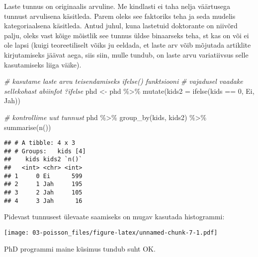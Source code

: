 \documentclass[
]{book}
\newenvironment{Shaded}{\begin{snugshade}}{\end{snugshade}}
\newcommand{\AttributeTok}[1]{\textcolor[rgb]{0.77,0.63,0.00}{#1}}
\newcommand{\CommentTok}[1]{\textcolor[rgb]{0.56,0.35,0.01}{\textit{#1}}}
\newcommand{\DecValTok}[1]{\textcolor[rgb]{0.00,0.00,0.81}{#1}}
\newcommand{\FunctionTok}[1]{\textcolor[rgb]{0.00,0.00,0.00}{#1}}
\newcommand{\NormalTok}[1]{#1}
\newcommand{\OtherTok}[1]{\textcolor[rgb]{0.56,0.35,0.01}{#1}}
\newcommand{\SpecialCharTok}[1]{\textcolor[rgb]{0.00,0.00,0.00}{#1}}
\newcommand{\StringTok}[1]{\textcolor[rgb]{0.31,0.60,0.02}{#1}}
\begin{document}
Laste tunnus on originaalis arvuline. Me kindlasti ei taha nelja väärtusega tunnust arvulisena käsitleda. Parem oleks see faktoriks teha ja seda mudelis kategoriaalsena käsitleda. Antud juhul, kuna lastetuid doktorante on niivõrd palju, oleks vast kõige mõistlik see tunnus üldse binaarseks teha, st kas on või ei ole lapsi (kuigi teoreetiliselt võiks ju eeldada, et laste arv võib mõjutada artiklite kirjutamiseks jäävat aega, siis siin, mulle tundub, on laste arvu variatiivsus selle kasutamiseks liiga väike).

\begin{Shaded}
\begin{Highlighting}[]
\CommentTok{\# kasutame laste arvu teisendamiseks ifelse() funktsiooni}
\CommentTok{\# vajadusel vaadake sellekohast abiinfot ?ifelse}
\NormalTok{phd }\OtherTok{\textless{}{-}}\NormalTok{ phd }\SpecialCharTok{\%\textgreater{}\%} 
  \FunctionTok{mutate}\NormalTok{(}\AttributeTok{kids2 =} \FunctionTok{ifelse}\NormalTok{(kids }\SpecialCharTok{==} \DecValTok{0}\NormalTok{, }\StringTok{\textquotesingle{}Ei\textquotesingle{}}\NormalTok{, }\StringTok{\textquotesingle{}Jah\textquotesingle{}}\NormalTok{))}

\CommentTok{\# kontrollime uut tunnust}
\NormalTok{phd }\SpecialCharTok{\%\textgreater{}\%} 
  \FunctionTok{group\_by}\NormalTok{(kids, kids2) }\SpecialCharTok{\%\textgreater{}\%} 
  \FunctionTok{summarise}\NormalTok{(}\FunctionTok{n}\NormalTok{())}
\end{Highlighting}
\end{Shaded}

\begin{verbatim}
## # A tibble: 4 x 3
## # Groups:   kids [4]
##    kids kids2 `n()`
##   <int> <chr> <int>
## 1     0 Ei      599
## 2     1 Jah     195
## 3     2 Jah     105
## 4     3 Jah      16
\end{verbatim}

Pidevast tunnusest ülevaate saamiseks on mugav kasutada histogrammi:

\begin{Shaded}
\end{Shaded}

\texttt{[image: 03-poisson\_files/figure-latex/unnamed-chunk-7-1.pdf]}

PhD programmi maine küsimus tundub suht OK.
\end{document}
